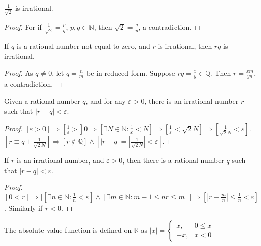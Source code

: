             \begin{theorem}
                $\frac{1}{\sqrt{2}}$ is irrational. 
            \end{theorem}
            \begin{proof}
                For if $\frac{1}{\sqrt{2}}=\frac{p}{q}$, $p,q\in \mathbb{N}$,
                then $\sqrt{2}=\frac{q}{p}$, a contradiction.
            \end{proof}
            \begin{theorem}
            If $q$ is a rational number not equal to zero, and $r$ is irrational, then $rq$ is irrational.
            \end{theorem}
            \begin{proof}
            As $q\ne 0$, let $q = \frac{n}{m}$ be in reduced form. Suppose $rq = \frac{x}{y}\in \mathbb{Q}$. Then $r=\frac{xm}{yn}$, a contradiction.
            \end{proof}
            \begin{theorem}
            Given a rational number $q$, and for any $\varepsilon>0$, there is an irrational number $r$ such that $|r-q|<\varepsilon$.
            \end{theorem}
            \begin{proof}
            $[\varepsilon>0]\Rightarrow [\frac{1}{\varepsilon}>]0\Rightarrow [\exists N\in \mathbb{N}:\frac{1}{\varepsilon}<N]\Rightarrow [\frac{1}{\varepsilon} < \sqrt{2}N]\Rightarrow [\frac{1}{\sqrt{2}N}< \varepsilon]$. $[r \equiv q+\frac{1}{\sqrt{2}{N}}]\Rightarrow [r\notin \mathbb{Q}]\land [|r-q| = |\frac{1}{\sqrt{2}N}| < \varepsilon]$.
            \end{proof}
            \begin{theorem}
            If $r$ is an irrational number, and $\varepsilon>0$, then there is a rational number $q$ such that $|r-q|<\varepsilon$.
            \end{theorem}
            \begin{proof}
            $[0<r]\Rightarrow \big[[\exists n\in \mathbb{N}: \frac{1}{n} < \varepsilon]\land[\exists m\in \mathbb{N}: m-1\leq nr \leq m]\big]\Rightarrow[|r-\frac{m}{n}| \leq \frac{1}{n} < \varepsilon]$. Similarly if $r<0$.
            \end{proof}
            \begin{definition}
            The absolute value function is defined on $\mathbb{R}$ as $|x| = \begin{cases} x, & 0 \leq x \\ -x, & x<0 \end{cases}$
            \end{definition}
